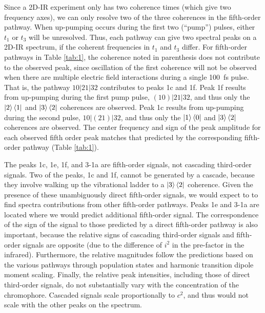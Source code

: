 \documentclass[%
  class = book,%
  crop = false,%
  float = true,%
  multi = true,%
  preview = false,%
]{standalone}
\begin{document}
{Since a 2D-IR experiment only has two coherence times (which give two frequency axes), we can only resolve two of the three coherences in the fifth-order pathway. When up-pumping occurs during the first two (``pump'') pulses, either \(t_1\) or \(t_3\) will be unresolved. Thus, each pathway can give two spectral peaks on a 2D-IR spectrum, if the coherent frequencies in \(t_1\) and \(t_3\) differ.  For fifth-order pathways in Table \ref{tab:1}, the coherence noted in parenthesis does not contribute to the observed peak, since oscillation of the first coherence will not be observed when there are multiple electric field interactions during a single \SI{100}{\fs} pulse. That is, the pathway \(10|21|32\) contributes to peaks 1c and 1f. Peak 1f results from up-pumping during the first pump pulse, \(\left(10\right)|21|32\), and thus only the \(\ket{2}\bra{1}\) and \(\ket{3}\bra{2}\) coherences are observed. Peak 1c results from up-pumping during the second pulse, \(10|\left(21\right)|32\), and thus only the \(\ket{1}\bra{0}\) and \(\ket{3}\bra{2}\) coherences are observed. The center frequency and sign of the peak amplitude for each observed fifth order peak matches that predicted by the corresponding fifth-order pathway (Table \ref{tab:1}).

The peaks 1c, 1e, 1f, and 3-1a are fifth-order signals, not cascading third-order signals. Two of the peaks, 1c and 1f, cannot be generated by a cascade, because they involve walking up the vibrational ladder to a \(\ket{3}\bra{2}\) coherence. Given the presence of these unambiguously direct fifth-order signals, we would expect to to find spectra contributions from other fifth-order pathways. Peaks 1e and 3-1a are located where we would predict additional fifth-order signal. The correspondence of the sign of the signal to those predicted by a direct fifth-order pathway is also important, because the relative signs of cascading third-order signals and fifth-order signals are opposite (due to the difference of \(i^2\) in the pre-factor in the infrared). Furthermore, the relative magnitudes follow the predictions based on the various pathways through population states and harmonic transition dipole moment scaling.\cite{Garrett-Roe2009a} Finally, the relative peak intensities, including those of direct third-order signals, do not substantially vary with the concentration of the chromophore. Cascaded signals scale proportionally to \(c^2\), and thus would not scale with the other peaks on the spectrum.

}
\end{document}
